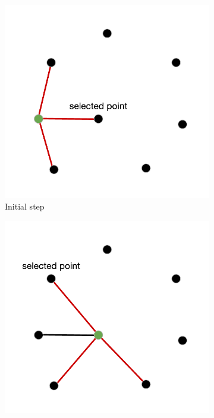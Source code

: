 \begin{figure}[h!]
  \centering
  \begin{subfigure}[b]{0.48\linewidth}
    \includegraphics[width=\linewidth]{media/grasp_fase1.pdf}
     \caption{Initial step}
  \end{subfigure}
  \begin{subfigure}[b]{0.48\linewidth}
    \includegraphics[width=\linewidth]{media/grasp_fase2.pdf}

\end{subfigure}
\end{figure}

